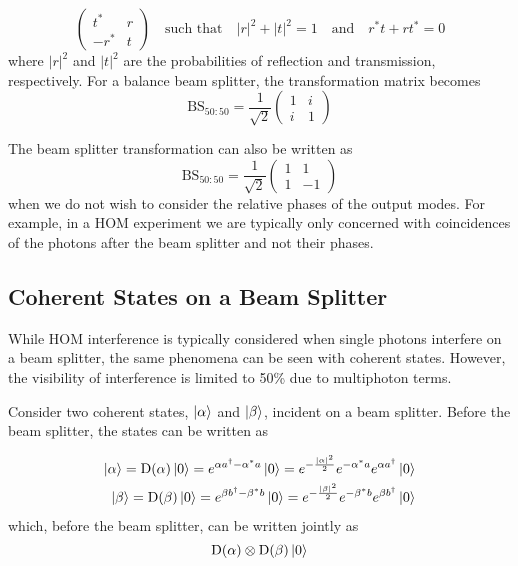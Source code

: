 \begin{equation}
	\left(
	\begin{matrix}
		t^\ast & r \\
		-r^\ast & t
	\end{matrix}
	\right)
	\quad\text{such that}\quad
	|r|^2 + |t|^2 = 1 
	\quad\text{and}\quad
	r^\ast t + r t^\ast = 0
\end{equation}
where $|r|^2$ and $|t|^2$ are the probabilities of reflection and transmission, respectively. For a balance beam splitter, the transformation matrix becomes
\begin{equation}
	\text{BS}_{50:50} = \frac{1}{\sqrt{2}}
	\left(
	\begin{matrix}
		1 & i \\
		i & 1
	\end{matrix}
	\right)	
\end{equation}

The beam splitter transformation can also be written as 
\begin{equation}
	\text{BS}_{50:50} = \frac{1}{\sqrt{2}}
	\left(
	\begin{matrix}
		1 & 1 \\
		1 & -1
	\end{matrix}
	\right)	
\end{equation}
when we do not wish to consider the relative phases of the output modes. For example, in a \ac{HOM} experiment we are typically only concerned with coincidences of the photons after the beam splitter and not their phases.

\subsection{Coherent States on a Beam Splitter}

While \ac{HOM} interference is typically considered when single photons interfere on a beam splitter, the same phenomena can be seen with coherent states.  However, the visibility of interference is limited to 50\% \cite{Rarity2005} due to multiphoton terms.

Consider two coherent states, $\ket{\alpha}$ and $\ket{\beta}$, incident on a beam splitter. Before the beam splitter, the states can be written as

\begin{equation}
\begin{split}
	\ket{\alpha} = \text{D}(\alpha)\ket{0} = e^{\alpha a^\dagger - \alpha^\ast a}\ket{0} = e^{-\frac{|\alpha|^2}{2}} e^{-\alpha^\ast a} e^{\alpha a^\dagger}\ket{0}\\
	\ket{\beta} = \text{D}(\beta)\ket{0} = e^{\beta b^\dagger - \beta^\ast b}\ket{0} = e^{-\frac{|\beta|^2}{2}} e^{-\beta^\ast b} e^{\beta b^\dagger}\ket{0}
\end{split}
\end{equation}
which, before the beam splitter, can be written jointly as
\begin{equation}
	\text{D}(\alpha)\otimes\text{D}(\beta)\ket{0}
\end{equation}

